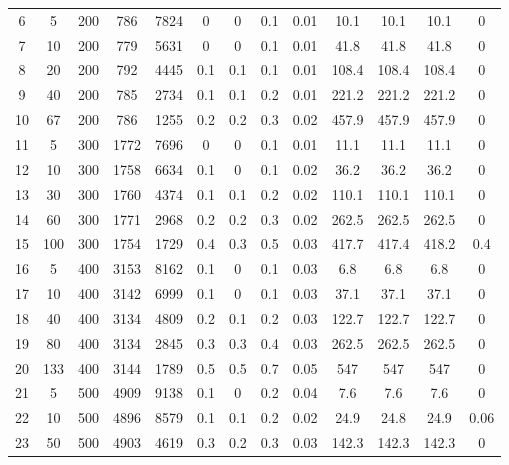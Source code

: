 \documentclass[11pt]{article}
\newcommand{\np}{\newpage}
\begin{document}
\begin{landscape}
\begin{longtable}[c]{ccccc|cccc|cccc}
			6  & 5   & 200 & 786   & 7824  & 0   & 0   & 0.1 & 0.01 & 10.1  & 10.1  & 10.1  & 0    \\
			7  & 10  & 200 & 779   & 5631  & 0   & 0   & 0.1 & 0.01 & 41.8  & 41.8  & 41.8  & 0    \\
			8  & 20  & 200 & 792   & 4445  & 0.1 & 0.1 & 0.1 & 0.01 & 108.4 & 108.4 & 108.4 & 0    \\
			9  & 40  & 200 & 785   & 2734  & 0.1 & 0.1 & 0.2 & 0.01 & 221.2 & 221.2 & 221.2 & 0    \\
			10 & 67  & 200 & 786   & 1255  & 0.2 & 0.2 & 0.3 & 0.02 & 457.9 & 457.9 & 457.9 & 0    \\
			\rowcolor[HTML]{EFEFEF} 
			11 & 5   & 300 & 1772  & 7696  & 0   & 0   & 0.1 & 0.01 & 11.1  & 11.1  & 11.1  & 0    \\
			\rowcolor[HTML]{EFEFEF} 
			12 & 10  & 300 & 1758  & 6634  & 0.1 & 0   & 0.1 & 0.02 & 36.2  & 36.2  & 36.2  & 0    \\
			\rowcolor[HTML]{EFEFEF} 
			13 & 30  & 300 & 1760  & 4374  & 0.1 & 0.1 & 0.2 & 0.02 & 110.1 & 110.1 & 110.1 & 0    \\
			\rowcolor[HTML]{EFEFEF} 
			14 & 60  & 300 & 1771  & 2968  & 0.2 & 0.2 & 0.3 & 0.02 & 262.5 & 262.5 & 262.5 & 0    \\
			\rowcolor[HTML]{EFEFEF} 
			15 & 100 & 300 & 1754  & 1729  & 0.4 & 0.3 & 0.5 & 0.03 & 417.7 & 417.4 & 418.2 & 0.4  \\
			16 & 5   & 400 & 3153  & 8162  & 0.1 & 0   & 0.1 & 0.03 & 6.8   & 6.8   & 6.8   & 0    \\
			17 & 10  & 400 & 3142  & 6999  & 0.1 & 0   & 0.1 & 0.03 & 37.1  & 37.1  & 37.1  & 0    \\
			18 & 40  & 400 & 3134  & 4809  & 0.2 & 0.1 & 0.2 & 0.03 & 122.7 & 122.7 & 122.7 & 0    \\
			19 & 80  & 400 & 3134  & 2845  & 0.3 & 0.3 & 0.4 & 0.03 & 262.5 & 262.5 & 262.5 & 0    \\
			20 & 133 & 400 & 3144  & 1789  & 0.5 & 0.5 & 0.7 & 0.05 & 547   & 547   & 547   & 0    \\ 
			\np
			\rowcolor[HTML]{EFEFEF} 
			21 & 5   & 500 & 4909  & 9138  & 0.1 & 0   & 0.2 & 0.04 & 7.6   & 7.6   & 7.6   & 0    \\
			\rowcolor[HTML]{EFEFEF} 
			22 & 10  & 500 & 4896  & 8579  & 0.1 & 0.1 & 0.2 & 0.02 & 24.9  & 24.8  & 24.9  & 0.06 \\
			\rowcolor[HTML]{EFEFEF} 
			23 & 50  & 500 & 4903  & 4619  & 0.3 & 0.2 & 0.3 & 0.03 & 142.3 & 142.3 & 142.3 & 0    \\

\end{longtable}
\end{landscape}
\end{document}
